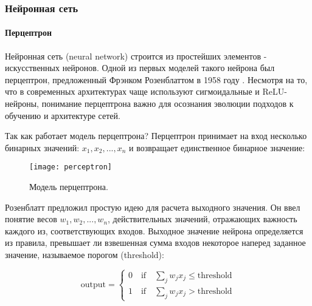\subsubsection{Нейронная сеть}

\paragraph{Перцептрон}

Нейронная сеть (neural network) строится из простейших элементов - искусственных 
нейронов. Одной из первых моделей такого нейрона был перцептрон, 
предложенный Фрэнком Розенблаттом в 1958 году \cite{Rosenblatt_perceptron}. Несмотря на то, что в 
современных архитектурах чаще используют сигмоидальные и ReLU-нейроны, 
понимание перцептрона важно для осознания эволюции подходов к обучению 
и архитектуре сетей.



Так как работает модель перцептрона? Перцептрон принимает на вход несколько бинарных значений: 
$x_1, x_2, ..., x_n $ и возвращает единственное бинарное значение:

\begin{figure}[h!]
    \centering
    \texttt{[image: perceptron]}
    \caption{Модель перцептрона.}
    \label{fig:perceptron}
\end{figure}

Розенблатт предложил простую идею для расчета выходного значения. Он ввел понятие 
весов $w_1, w_2, ..., w_n$, действительных значений, отражающих важность каждого из, 
соответствующих входов. Выходное значение нейрона определяется из правила, превышает 
ли взвешенная сумма входов некоторое наперед заданное значение, называемое порогом 
(threshold):

\begin{equation*}
    \text{output} = \begin{cases}
        0 \quad \text{if} \quad \sum_j w_j x_j \leq \text{threshold} \\
        1 \quad \text{if} \quad \sum_j w_j x_j > \text{threshold} 
    \end{cases}
\end{equation*}

